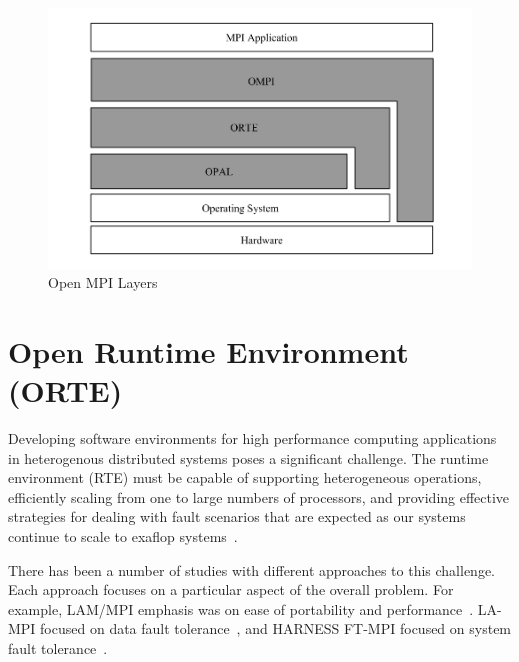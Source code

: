 \begin{figure}[h!]
\centering
\includegraphics[scale=0.4]{images/open-mpi-layers.png}
\caption{Open MPI Layers}
\label{fig:open-mpi-layers}
\end{figure}


\section{Open Runtime Environment (ORTE)}
\label{sec:orte}
Developing software environments for high performance computing applications in heterogenous distributed systems poses a significant challenge. The runtime environment (RTE) must be capable of supporting heterogeneous operations, efficiently scaling from one to large numbers of processors, and providing effective strategies for dealing with fault scenarios that are expected as our systems continue to scale to exaflop systems~\cite{kronstadt2005peta}.

There has been a number of studies with different approaches to this challenge. Each approach focuses on a particular aspect of the overall problem. For example, LAM/MPI emphasis was on ease of portability and performance~\cite{squyres2004component}. LA-MPI focused on data fault tolerance~\cite{aulwes2004architecture}, and HARNESS FT-MPI focused on system fault tolerance~\cite{fagg2002harness}.

